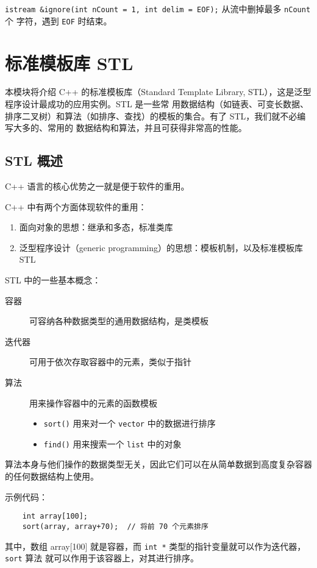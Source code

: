 \documentclass[UTF8]{ctexart}
\begin{document}
\texttt{istream &ignore(int nCount = 1, int delim = EOF);} 从流中删掉最多 \texttt{nCount} 个
字符，遇到 \texttt{EOF} 时结束。

\section{标准模板库 STL}
本模块将介绍 C++ 的标准模板库（Standard Template Library, STL），这是泛型程序设计最成功的应用实例。STL 是一些常
用数据结构（如链表、可变长数据、排序二叉树）和算法（如排序、查找）的模板的集合。有了 STL，我们就不必编写大多的、常用的
数据结构和算法，并且可获得非常高的性能。

\subsection{STL 概述}
C++ 语言的核心优势之一就是便于软件的重用。

C++ 中有两个方面体现软件的重用：
\begin{enumerate}
    \item 面向对象的思想：继承和多态，标准类库
    \item 泛型程序设计（generic programming）的思想：模板机制，以及标准模板库 STL
\end{enumerate}

STL 中的一些基本概念：
\begin{description}
    \item[容器] 可容纳各种数据类型的通用数据结构，是类模板
    \item[迭代器] 可用于依次存取容器中的元素，类似于指针
    \item[算法] 用来操作容器中的元素的函数模板
    \begin{itemize}
        \item \texttt{sort()} 用来对一个 \texttt{vector} 中的数据进行排序
        \item \texttt{find()} 用来搜索一个 \texttt{list} 中的对象
    \end{itemize}
\end{description}

算法本身与他们操作的数据类型无关，因此它们可以在从简单数据到高度复杂容器的任何数据结构上使用。

示例代码：
\begin{verbatim}
    int array[100];
    sort(array, array+70);  // 将前 70 个元素排序
\end{verbatim}
其中，数组 array[100] 就是容器，而 \texttt{int *} 类型的指针变量就可以作为迭代器，\texttt{sort} 算法
就可以作用于该容器上，对其进行排序。
\end{document}
